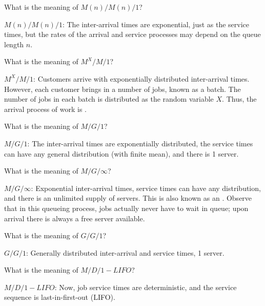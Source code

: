 \begin{exercise}
  What is the meaning of $M(n)/M(n)/1$?
  \begin{solution}
$M(n)/M(n)/1$: The inter-arrival times are exponential, just as
  the service times, but the rates of the arrival and service processes
  may depend on the queue length $n$. 
  \end{solution}
\end{exercise}


\begin{exercise}
  What is the meaning of $M^X/M/1$?
  \begin{solution}
 $M^X/M/1$: Customers arrive with exponentially distributed
  inter-arrival times. However, each customer brings in a number of
  jobs, known as a batch. The number of jobs in each batch is
  distributed as the random variable $X$. Thus, the arrival process of
  work is .
  \end{solution}
\end{exercise}

\begin{extra}
  What is the meaning of $M/G/1$?
  \begin{solution}
$M/G/1$: The inter-arrival times are exponentially distributed,
  the service times can have any general distribution (with
  finite mean), and there is 1 server.
  \end{solution}
\end{extra}


\begin{extra}
  What is the meaning of $M/G/\infty$?
  \begin{solution}
 $M/G/\infty$: Exponential inter-arrival times, service times can
  have any distribution, and there is an unlimited supply of
  servers. This is also known as an . Observe
  that in this queueing process, jobs actually never have to wait in
  queue; upon arrival there is always a free server available.
  \end{solution}
\end{extra}

\begin{extra}
  What is the meaning of $G/G/1$?
  \begin{solution}
 $G/G/1$: Generally distributed inter-arrival and service times, 1 server.
  \end{solution}
\end{extra}

\begin{extra}
  What is the meaning of $M/D/1-LIFO$?
  \begin{solution}
 $M/D/1-LIFO$:  Now, job service times are deterministic, and the service sequence is last-in-first-out (LIFO).
  \end{solution}
\end{extra}

